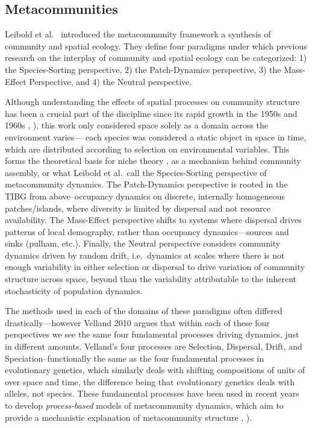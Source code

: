 \documentclass[]{article}
\begin{document}
\hypertarget{metacommunities}{%
\subsection{Metacommunities}\label{metacommunities}}

Leibold et al.~\citep{leibold_metacommunity_2004} introduced
the metacommunity framework a synthesis of community and spatial
ecology. They define four paradigms under which previous research on the
interplay of community and spatial ecology can be categorized: 1) the
Species-Sorting perspective, 2) the Patch-Dynamics perspective, 3) the
Mass-Effect Perspective, and 4) the Neutral perspective.

Although understanding the effects of spatial processes on community
structure has been a crucial part of the discipline since its rapid
growth in the 1950s and 1960s \citep{hutchinson_ecological_1973},
\citep{chase_ecological_2003}), this work only considered space solely as a
domain across the environment varies--- each species was considered a
static object in space in time, which are distributed according to
selection on environmental variables. This forms the theoretical basis
for niche theory \citep{hutchinson_ecological_1973,chase_ecological_2003}, as a mechanism behind community assembly, or what
Leibold et al.~call the Species-Sorting perspective of metacommunity
dynamics. The Patch-Dynamics perspective is rooted in the TIBG from
above--occupancy dynamics on discrete, internally homogeneous
patches/islands, where diversity is limited by dispersal and not
resource availability. The Mass-Effect perspective shifts to systems
where dispersal drives patterns of local demography, rather than
occupancy dynamics---sources and sinks (pulham, etc.). Finally, the
Neutral perspective considers community dynamics driven by random drift,
i.e.~dynamics at scales where there is not enough variability in either
selection or dispersal to drive variation of community structure across
space, beyond than the variability attributable to the inherent
stochasticity of population dynamics.

The methods used in each of the domains of these paradigms often
differed drastically---however Velland 2010 \citep{vellend_conceptual_2010} argues
that within each of these four perspectives we see the same four
fundamental processes driving dynamics, just in different amounts.
Velland's four processes are Selection, Dispersal, Drift, and
Speciation--functionally the same as the four fundamental processes in
evolutionary genetics, which similarly deals with shifting compositions
of units of over space and time, the difference being that evolutionary
genetics deals with alleles, not species. These fundamental processes
have been used in recent years to develop \emph{process-based} models of
metacommunity dynamics, which aim to provide a mechanistic explanation of metacommunity structure
\citep{poisot_2014}, \citep{thompson}).
\end{document}
